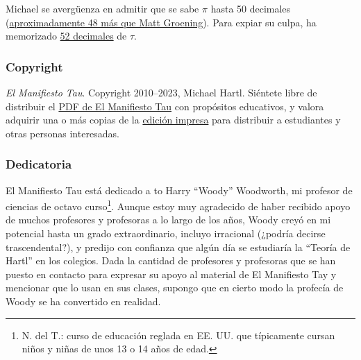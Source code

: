 Michael se avergüenza en admitir que se sabe $\pi$ hasta 50 decimales (\href{\#fig-futurama_video}{aproximadamente 48 más que Matt Groening}). Para expiar su culpa, ha memorizado \href{http://www.wolframalpha.com/input/?i=N[2+Pi,+53]}{52 decimales} de $\tau$.

    \subsubsection{Copyright} %
    \label{sec:copyright_and_license}

    \emph{El Manifiesto Tau}. Copyright 2010--2023, Michael Hartl. Siéntete libre de distribuir el \href{https://tauday.com/tau_manifesto.pdf}{PDF de El Manifiesto Tau} con propósitos educativos, y valora adquirir una o más copias de la \href{https://tauday.com/print}{edición impresa} para distribuir a estudiantes y otras personas interesadas.



    \subsubsection{Dedicatoria} %
    \label{sec:dedication}

    El Manifiesto Tau está dedicado a to Harry ``Woody'' Woodworth, mi profesor de ciencias de octavo curso\footnote{N. del T.: curso de educación reglada en EE. UU. que típicamente cursan niños y niñas de unos 13 o 14 años de edad.}. Aunque estoy muy agradecido de haber recibido apoyo de muchos profesores y profesoras a lo largo de los años, Woody creyó en mi potencial hasta un grado extraordinario, incluyo irracional (¿podría decirse trascendental?), y predijo con confianza que algún día se estudiaría la ``Teoría de Hartl'' en los colegios. Dada la cantidad de profesores y profesoras que se han puesto en contacto para expresar su apoyo al material de El Manifiesto Tay y mencionar que lo usan en sus clases, supongo que en cierto modo la profecía de Woody se ha convertido en realidad.

